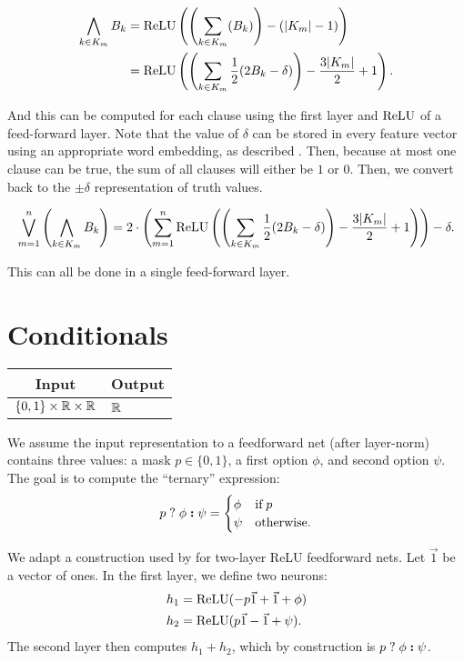     \begin{align*}
    \bigwedge_{k\in K_m} B_k &= \text{ReLU}\left(\left(\sum_{k\in K_m} (B_k)\right) -(|K_m|-1)\right) \\ &=\text{ReLU}\left(\left(\sum_{k\in K_m} \frac{1}{2}(2B_k-\delta) \right) - \frac{3|K_m|}{2}+1\right).
    \end{align*}

    And this can be computed for each clause using the first layer and $\text{ReLU}$ of a feed-forward layer.
    Note that the value of $\delta$ can be stored in every feature vector using an appropriate word embedding, as described .
    Then, because at most one clause can be true, the sum of all clauses will either be $1$ or $0$. Then, we convert back to the $\pm\delta$ representation of truth values.

    \[\bigvee_{m=1}^n \left(\bigwedge_{k\in K_m} B_k \right)=2\cdot\left(\sum_{m=1}^n\text{ReLU}\left(\left(\sum_{k\in K_m} \frac{1}{2}(2B_k-\delta) \right) - \frac{3|K_m|}{2}+1\right)\right)-\delta.\]

    This can all be done in a single feed-forward layer.


\section{Conditionals}\label{sec:ffnn_conditional}

    \begin{tabular}{|c|p{1.5cm}|}
        \hline
        \rowcolor{orange!20} %
        \textbf{Input} & \textbf{Output} \\
        \hline
        $\{0,1\}\times \mathbb{R} \times \mathbb{R}$ & $\mathbb{R}$ \\
        \hline
    \end{tabular}

    We assume the input representation to a feedforward net (after layer-norm) contains three values: a mask $p \in \{0, 1\}$, a first option $\phi$, and second option $\psi$. The goal is to compute the ``ternary'' expression:
    \begin{equation*}
        p\;\mathbf{?}\; \phi\; \textbf{:} \;\psi =
        \begin{cases}
            \phi & \textrm{if} \; p \\
            \psi & \textrm{otherwise.}
        \end{cases}
    \end{equation*}

    We adapt a construction used by \citet[Theorem 1]{merrill-sabharwal-2024-cot} for two-layer ReLU feedforward nets.
    Let $\vec 1$ be a vector of ones.
    In the first layer, we define two neurons:
    \begin{align*}
        h_1 &= \text{ReLU}(-p \vec 1 + \vec 1 + \phi) \\
        h_2 &= \text{ReLU}(p \vec 1 - \vec 1 + \psi) .
    \end{align*}
    The second layer then computes $h_1 + h_2$, which by construction is $p\;\mathbf{?}\; \phi\; \textbf{:} \;\psi$.

